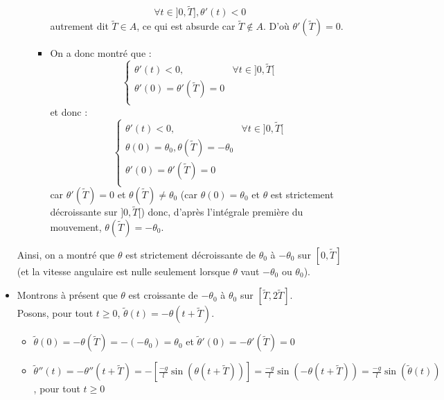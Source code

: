 \documentclass[9pt,a4paper]{article}
\begin{document}
\begin{itemize}[label=\textbullet]
\begin{itemize}[label=\textbullet]
\begin{itemize}[label=\textbullet]
            $$
            \forall t \in ]0, \tilde{T}], \theta'(t) < 0
            $$
            autrement dit $\tilde{T} \in A$, ce qui est absurde car $\tilde{T} \notin A$. D'où $\theta'(\tilde{T}) = 0$.
            \item On a donc montré que :
            $$
            \left\{
            \begin{array}{lcl}
                \theta'(t) < 0, & \forall t \in ]0, \tilde{T}[ \\
                \theta'(0) = \theta'(\tilde{T}) = 0 \\
            \end{array}
            \right.
            $$
            et donc :
            $$
            \left\{
            \begin{array}{lcl}
                \theta'(t) < 0, & \forall t \in ]0, \tilde{T}[ \\
                \theta(0) = \theta_0, \theta(\tilde{T}) = -\theta_0 \\
                \theta'(0) = \theta'(\tilde{T}) = 0 \\
            \end{array}
            \right.
            $$
            car $\theta'(\tilde{T}) = 0$ et $\theta(\tilde{T}) \neq \theta_0$ (car $\theta(0) = \theta_0$ et $\theta$ est strictement décroissante sur $]0, \tilde{T}[$) donc, d'après l'intégrale première du mouvement, $\theta(\tilde{T}) = -\theta_0$.
        \end{itemize}
    \end{itemize}
    Ainsi, on a montré que $\theta$ est strictement décroissante de $\theta_0$ à $-\theta_0$ sur $[0, \tilde{T}]$ (et la vitesse angulaire est nulle seulement lorsque $\theta$ vaut $-\theta_0$ ou $\theta_0$).
    \item Montrons à présent que $\theta$ est croissante de $-\theta_0$ à $\theta_0$ sur $[\tilde{T}, 2\tilde{T}]$.\\
    Posons, pour tout $t \geq 0$, $\tilde{\theta}(t) = -\theta(t + \tilde{T})$.
    \begin{itemize}[label=\textbullet]
        \item $\tilde{\theta}(0) = -\theta(\tilde{T}) = -(-\theta_0) = \theta_0$ et $\tilde{\theta}'(0) = -\theta'(\tilde{T}) = 0$
        \item $\tilde{\theta}''(t) = -\theta''(t + \tilde{T}) = -[\frac{-g}{l}\sin(\theta(t + \tilde{T}))] = \frac{-g}{l}\sin(-\theta(t + \tilde{T})) = \frac{-g}{l}\sin(\tilde{\theta}(t))$, pour tout $t \geq 0$
    \end{itemize}

\end{itemize}
\end{document}
